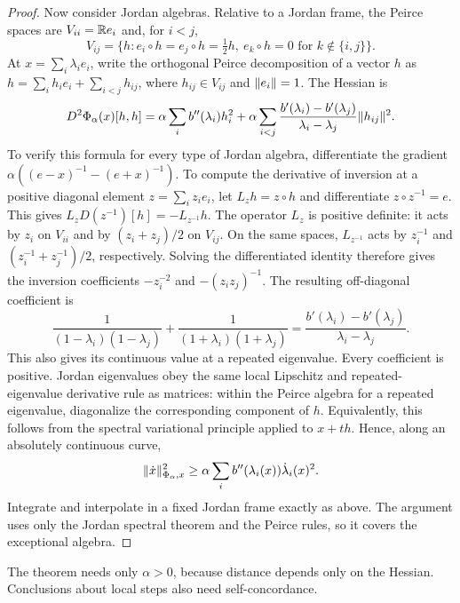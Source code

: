\begin{proof}
Now consider Jordan algebras. Relative to a Jordan frame, the
Peirce spaces are $V_{ii}=\mathbb R e_i$ and, for $i<j$,
\[
 V_{ij}=\{h:e_i\circ h=e_j\circ h=\tfrac12h,
                  \ e_k\circ h=0\text{ for }k\notin\{i,j\}\}.
\]
At $x=\sum_i\lambda_i e_i$, write the orthogonal Peirce decomposition
of a vector $h$ as $h=\sum_i h_i e_i+\sum_{i<j}h_{ij}$, where
$h_{ij}\in V_{ij}$ and $\lVert e_i\rVert=1$. The Hessian is
\begin{equation}
 D^2\Phi_\alpha(x)[h,h]
 =\alpha\sum_i b''(\lambda_i)h_i^2
 +\alpha\sum_{i<j}
 \frac{b'(\lambda_i)-b'(\lambda_j)}{\lambda_i-\lambda_j}
       \lVert h_{ij}\rVert^2.
 \label{eq:jordan-Hessian}
\end{equation}
To verify this formula for every type of Jordan algebra, differentiate
the gradient
$\alpha((e-x)^{-1}-(e+x)^{-1})$.
To compute the derivative of inversion at a positive diagonal element
$z=\sum_i z_i e_i$, let $L_z h=z\circ h$ and differentiate
$z\circ z^{-1}=e$. This gives
$L_z D(z^{-1})[h]=-L_{z^{-1}}h$.
The operator $L_z$ is positive definite: it acts by $z_i$ on $V_{ii}$
and by $(z_i+z_j)/2$ on $V_{ij}$.
On the same spaces, $L_{z^{-1}}$ acts by $z_i^{-1}$ and
$(z_i^{-1}+z_j^{-1})/2$, respectively. Solving the differentiated
identity therefore gives the inversion coefficients $-z_i^{-2}$ and
$-(z_i z_j)^{-1}$. The resulting off-diagonal coefficient is
\[
 \frac1{(1-\lambda_i)(1-\lambda_j)}
 +\frac1{(1+\lambda_i)(1+\lambda_j)}
 =\frac{b'(\lambda_i)-b'(\lambda_j)}{\lambda_i-\lambda_j}.
\]
This also gives its continuous value at a repeated eigenvalue.
Every coefficient is positive. Jordan eigenvalues obey the same local
Lipschitz and repeated-eigenvalue derivative rule as matrices: within
the Peirce
algebra for a repeated eigenvalue, diagonalize the corresponding
component of $h$. Equivalently, this follows from the spectral variational
principle applied to $x+th$. Hence, along an absolutely continuous curve,
\[
 \lVert \dot x\rVert_{\Phi_\alpha,x}^2
 \geq\alpha\sum_i b''(\lambda_i(x))\dot\lambda_i(x)^2.
\]
Integrate and interpolate in a fixed Jordan frame exactly as above.
The argument uses only the Jordan spectral theorem and the Peirce rules,
so it covers the exceptional algebra.
\end{proof}

The theorem needs only $\alpha>0$, because distance depends only on
the Hessian. Conclusions about local steps also need self-concordance.

